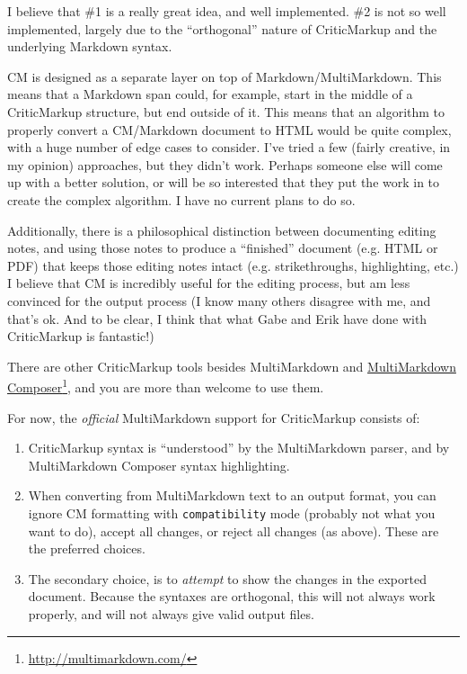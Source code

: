 I believe that \#1 is a really great idea, and well implemented. \#2 is not so well implemented, largely due to the ``orthogonal'' nature of CriticMarkup and the underlying Markdown syntax.

CM is designed as a separate layer on top of Markdown\slash MultiMarkdown. This means that a Markdown span could, for example, start in the middle of a CriticMarkup structure, but end outside of it. This means that an algorithm to properly convert a CM\slash Markdown document to HTML would be quite complex, with a huge number of edge cases to consider. I've tried a few (fairly creative, in my opinion) approaches, but they didn't work. Perhaps someone else will come up with a better solution, or will be so interested that they put the work in to create the complex algorithm. I have no current plans to do so.

Additionally, there is a philosophical distinction between documenting editing notes, and using those notes to produce a ``finished'' document (e.g. HTML or PDF) that keeps those editing notes intact (e.g. strikethroughs, highlighting, etc.) I believe that CM is incredibly useful for the editing process, but am less convinced for the output process (I know many others disagree with me, and that's ok. And to be clear, I think that what Gabe and Erik have done with CriticMarkup is fantastic!)

There are other CriticMarkup tools besides MultiMarkdown and \href{http://multimarkdown.com/}{MultiMarkdown Composer}\footnote{\href{http://multimarkdown.com/}{http:\slash \slash multimarkdown.com\slash }}, and you are more than welcome to use them.

For now, the \emph{official} MultiMarkdown support for CriticMarkup consists of:

\begin{enumerate}
\item CriticMarkup syntax is ``understood'' by the MultiMarkdown parser, and by MultiMarkdown Composer syntax highlighting.

\item When converting from MultiMarkdown text to an output format, you can ignore CM formatting with \texttt{compatibility} mode (probably not what you want to do), accept all changes, or reject all changes (as above). These are the preferred choices.

\item The secondary choice, is to \emph{attempt} to show the changes in the exported document. Because the syntaxes are orthogonal, this will not always work properly, and will not always give valid output files.

\end{enumerate}

